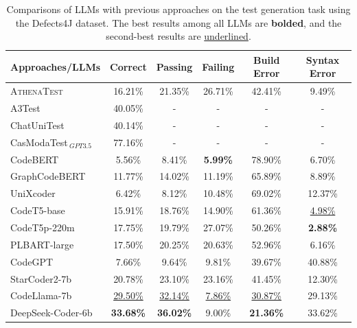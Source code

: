 \begin{table}[htbp]
\centering
\small
\caption{Comparisons of LLMs with previous approaches on the test generation task using the Defects4J dataset. The best results among all LLMs are \textbf{bolded}, and the second-best results are \uline{underlined}.}
\label{tab:tg_comparisons_llm}
\begin{tabular}{lccccc}
\toprule
\textbf{Approaches/LLMs} & \textbf{Correct} & \textbf{Passing} & \textbf{Failing} & \textbf{Build Error} & \textbf{Syntax Error} \\
\midrule
\textsc{AthenaTest} & 16.21\% & 21.35\% & 26.71\% & 42.41\% & 9.49\% \\
A3Test & 40.05\% & - & - & - & - \\
ChatUniTest & 40.14\% & - & - & - & - \\
CasModaTest$_{~GPT3.5}$ & 77.16\%  & - & - & - & - \\
\midrule
CodeBERT & 5.56\% & 8.41\% & \textbf{5.99\%} & 78.90\% & 6.70\% \\
GraphCodeBERT & 11.77\% & 14.02\% & 11.19\% & 65.89\% & 8.89\% \\
UniXcoder & 6.42\% & 8.12\% & 10.48\% & 69.02\% & 12.37\% \\
CodeT5-base & 15.91\% & 18.76\% & 14.90\% & 61.36\% & \uline{4.98\%} \\
CodeT5p-220m & 17.75\% & 19.79\% & 27.07\% & 50.26\% & \textbf{2.88\%} \\
PLBART-large & 17.50\% & 20.25\% & 20.63\% & 52.96\% & 6.16\% \\
CodeGPT & 7.66\% & 9.64\% & 9.81\% & 39.67\% & 40.88\% \\
StarCoder2-7b & 20.78\% & 23.10\% & 23.16\% & 41.45\% & 12.30\% \\
CodeLlama-7b & \uline{29.50\%} & \uline{32.14\%} & \uline{7.86\%} & \uline{30.87\%} & 29.13\% \\
DeepSeek-Coder-6b & \textbf{33.68\%} & \textbf{36.02\%} & 9.00\% & \textbf{21.36\%} & 33.62\% \\
\bottomrule
\end{tabular}
\vspace{-0.5cm}
\end{table}
